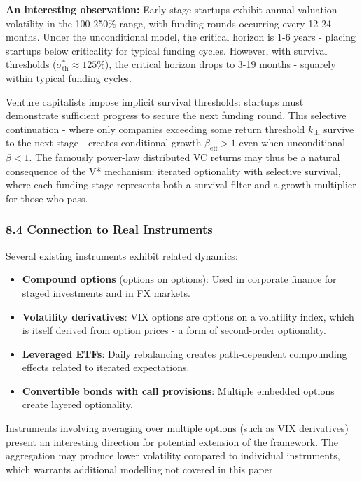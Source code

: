 \documentclass[
  11pt,
  openany]{article}
\providecommand{\tightlist}{%
  \setlength{\itemsep}{0pt}\setlength{\parskip}{0pt}}
\providecommand{\tightlist}{%
  \setlength{\itemsep}{0pt}\setlength{\parskip}{0pt}}
\begin{document}
\textbf{An interesting observation:} Early-stage startups exhibit annual
valuation volatility in the 100-250\% range, with funding rounds
occurring every 12-24 months. Under the unconditional model, the
critical horizon is 1-6 years - placing startups below criticality for
typical funding cycles. However, with survival thresholds
(\(\sigma_{\text{th}}^{*} \approx 125\%\)), the critical horizon drops
to 3-19 months - squarely within typical funding cycles.

Venture capitalists impose implicit survival thresholds: startups must
demonstrate sufficient progress to secure the next funding round. This
selective continuation - where only companies exceeding some return
threshold \(k_{\text{th}}\) survive to the next stage - creates
conditional growth \(\beta_{\text{eff}} > 1\) even when unconditional
\(\beta < 1\). The famously power-law distributed VC returns may thus be
a natural consequence of the V* mechanism: iterated optionality with
selective survival, where each funding stage represents both a survival
filter and a growth multiplier for those who pass.

\subsubsection{8.4 Connection to Real
Instruments}\label{connection-to-real-instruments}

Several existing instruments exhibit related dynamics:

\begin{itemize}
\tightlist
\item
  \textbf{Compound options} (options on options): Used in corporate
  finance for staged investments and in FX markets.
\item
  \textbf{Volatility derivatives}: VIX options are options on a
  volatility index, which is itself derived from option prices - a form
  of second-order optionality.
\item
  \textbf{Leveraged ETFs}: Daily rebalancing creates path-dependent
  compounding effects related to iterated expectations.
\item
  \textbf{Convertible bonds with call provisions}: Multiple embedded
  options create layered optionality.
\end{itemize}

Instruments involving averaging over multiple options (such as VIX
derivatives) present an interesting direction for potential extension of
the framework. The aggregation may produce lower volatility compared to
individual instruments, which warrants additional modelling not covered
in this paper.
\end{document}
